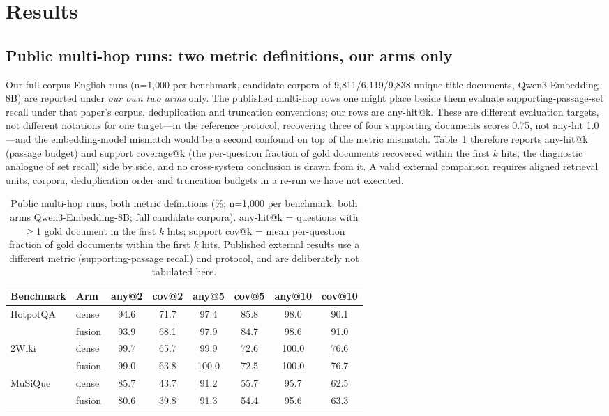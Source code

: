 \documentclass[sigconf,nonacm]{acmart}
\begin{document}
\section{Results}
\label{sec:results}

\subsection{Public multi-hop runs: two metric definitions, our arms
only}

Our full-corpus English runs (n=1{,}000 per benchmark, candidate
corpora of 9{,}811/6{,}119/9{,}838 unique-title documents,
Qwen3-Embedding-8B) are reported under \emph{our own two arms} only.
The published multi-hop rows one might place beside them evaluate
supporting-passage-set recall under that paper's corpus, deduplication
and truncation conventions; our rows are any-hit@k. These are
different evaluation targets, not different notations for one
target---in the reference protocol, recovering three of four supporting
documents scores 0.75, not any-hit 1.0---and the embedding-model
mismatch would be a second confound on top of the metric mismatch.
Table~\ref{tab:bench} therefore reports any-hit@k (passage budget) and
support coverage@k (the per-question fraction of gold documents
recovered within the first $k$ hits, the diagnostic analogue of set
recall) side by side, and no cross-system conclusion is drawn from it.
A valid external comparison requires aligned retrieval units, corpora,
deduplication order and truncation budgets in a re-run we have not
executed.

\begin{table}[!t]
\centering
\caption{Public multi-hop runs, both metric definitions (\%; n=1{,}000
per benchmark; both arms Qwen3-Embedding-8B; full candidate corpora).
any-hit@k = questions with $\geq$1 gold document in the first $k$
hits; support cov@k = mean per-question fraction of gold documents
within the first $k$ hits. Published external results use a different
metric (supporting-passage recall) and protocol, and are deliberately
not tabulated here.}
\label{tab:bench}
\begin{tabular}{llcccccc}
\toprule
Benchmark & Arm & any@2 & cov@2 & any@5 & cov@5 & any@10 & cov@10 \\
\midrule
HotpotQA & dense & 94.6 & 71.7 & 97.4 & 85.8 & 98.0 & 90.1 \\
 & fusion & 93.9 & 68.1 & 97.9 & 84.7 & 98.6 & 91.0 \\
\midrule
2Wiki & dense & 99.7 & 65.7 & 99.9 & 72.6 & 100.0 & 76.6 \\
 & fusion & 99.0 & 63.8 & 100.0 & 72.5 & 100.0 & 76.7 \\
\midrule
MuSiQue & dense & 85.7 & 43.7 & 91.2 & 55.7 & 95.7 & 62.5 \\
 & fusion & 80.6 & 39.8 & 91.3 & 54.4 & 95.6 & 63.3 \\
\bottomrule
\end{tabular}
\end{table}
\end{document}
